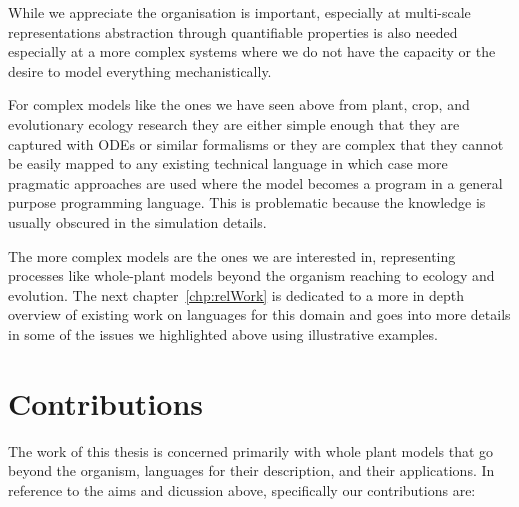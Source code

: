 While we appreciate the organisation is important, especially at multi-scale
representations abstraction through quantifiable properties is also needed
especially at a more complex systems where we do not have the capacity or the
desire to model everything mechanistically.

For complex models like the ones we have seen above from plant, crop, and
evolutionary ecology research they are either simple enough that they are
captured with ODEs or similar formalisms or they are complex that they cannot be
easily mapped to any existing technical language in which case more pragmatic
approaches are used where the model becomes a program in a general purpose
programming language. This is problematic because the knowledge is usually
obscured in the simulation details.

The more complex models are the ones we are interested in, representing
processes like whole-plant models beyond the organism reaching to ecology and
evolution. The next chapter~\ref{chp:relWork} is dedicated to a more in depth
overview of existing work on languages for this domain and goes into more
details in some of the issues we highlighted above using illustrative examples.


\section{Contributions}
The work of this thesis is concerned primarily with whole plant models that go
beyond the organism, languages for their description, and their applications. In
reference to the aims and dicussion above, specifically our contributions are:

